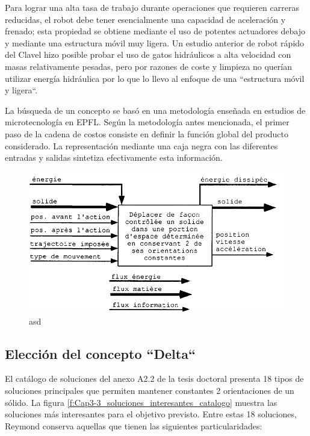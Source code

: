     Para lograr una alta tasa de trabajo durante operaciones que requieren carreras reducidas, el robot debe tener esencialmente una capacidad de aceleración y frenado; esta propiedad se obtiene mediante el uso de potentes actuadores debajo y mediante una estructura móvil muy ligera. Un estudio anterior de robot rápido del Clavel hizo posible probar el uso de gatos hidráulicos a alta velocidad con masas relativamente pesadas, pero por razones de coste y limpieza no querían utilizar energía hidráulica por lo que lo llevo al enfoque de una ``estructura móvil y ligera``.
    
    La búsqueda de un concepto se basó en una metodología enseñada en estudios de microtecnología en EPFL. Según la metodología antes mencionada, el primer paso de la cadena de costos consiste en definir la función global del producto considerado. La representación mediante una caja negra con las diferentes entradas y salidas sintetiza efectivamente esta información.
    
    \begin{figure}[htb]
        \centering
        \includegraphics[width=0.8\linewidth]{Main/Chapter3/Images3/3-3/caja-negra-reymond.png}
        \caption{asd}
        \label{f:Cap3-3_caja_negra_reymond}
    \end{figure}
    
    \newpage
    
    \subsection{Elección del concepto ``Delta``}
    El catálogo de soluciones del anexo A2.2 de la tesis doctoral \cite{Clavel:31403} presenta 18 tipos de soluciones principales que permiten mantener constantes 2 orientaciones de un sólido. La figura \ref{f:Cap3-3_soluciones_interesantes_catalogo} muestra las soluciones más interesantes para el objetivo previsto. Entre estas 18 soluciones, Reymond conserva aquellas que tienen las siguientes particularidades:

